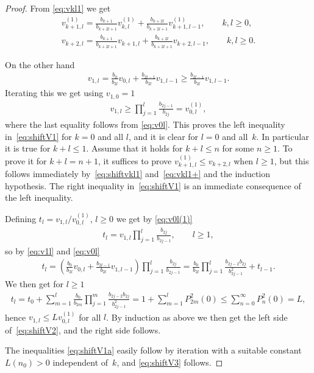 \begin{proof} From \eqref{eq:vkl1} we get
\begin{gather}\label{eq:shiftvkl1}
 v_{k+1,l}^{(1)}=\frac{b_{k+1}}{b_{k+2l+1}}v_{k,l}^{(1)}+ \frac{b_{k+2l}}{b_{k+2l+1}}v_{k+1,l-1}^{(1)},\qquad k,l\ge 0,\\
 \label{eq:vkl1+}
v_{k+2,l}=\frac{b_{k+1}}{b_{k+2l+1}}v_{k+1,l}+ \frac{b_{k+2l}}{b_{k+2l+1}}v_{k+2,l-1},\qquad k,l\ge 0.
\end{gather}

On the other hand
\begin{gather}\label{eq:v1l}
v_{1,l}=\frac{b_0}{b_{2l}} v_{0,l}+\frac{b_{2l-1}}{ b_{2l}}v_{1,l-1}\ge \frac{b_{2l-1}}{ b_{2l}}v_{1,l-1}.
\end{gather}
Iterating this we get using $v_{1,0}=1$
\begin{gather}\label{eq:v0l(1)}
v_{1,l}\ge \prod_{j=1}^l \frac{b_{2j-1}}{b_{2j}}=v_{0,l}^{(1)},
\end{gather}
where the last equality follows from \eqref{eq:v0l}. This proves the left inequality in~\eqref{eq:shiftV1} for $k=0$ and all $l$, and it is clear for $l=0$ and all~$k$. In particular it is true for $k+l\le 1$. Assume that it holds for $k+l\le n$ for some $n\ge 1$. To prove it for $k+l=n+1$, it suffices to prove $v_{k+1,l}^{(1)}\le v_{k+2,l}$ when $l\ge 1$, but this follows immediately by~\eqref{eq:shiftvkl1} and~\eqref{eq:vkl1+} and the induction hypothesis. The right inequality in~\eqref{eq:shiftV1} is an immediate consequence of the left inequality.

Defining $t_l=v_{1,l}/v_{0,l}^{(1)}$, $l\ge 0$ we get by \eqref{eq:v0l(1)}
\begin{gather*}
t_l=v_{1,l}\prod_{j=1}^l \frac{b_{2j}}{b_{2j-1}},\qquad l\ge 1,
\end{gather*}
so by \eqref{eq:v1l} and \eqref{eq:v0l}
\begin{gather*}
t_l=\left(\frac{b_0}{b_{2l}}v_{0,l}+\frac{b_{2l-1}}{b_{2l}}v_{1,l-1}\right)\prod_{j=1}^l \frac{b_{2j}}{b_{2j-1}}=\frac{b_0}{b_{2l}}\prod_{j=1}^l\frac{b_{2j-2}b_{2j}}{b_{2j-1}^2} + t_{l-1}.
\end{gather*}
We then get for $l\ge 1$
\begin{gather*}
t_l=t_0+\sum_{m=1}^l \frac{b_0}{b_{2m}}\prod_{j=1}^m \frac{b_{2j-2}b_{2j}}{b_{2j-1}^2} =1+\sum_{m=1}^l P_{2m}^2(0)\le \sum_{n=0}^\infty P_n^2(0)=L,
\end{gather*}
hence $v_{1,l}\le L v_{0,l}^{(1)}$ for all $l$. By induction as above we then get the left side of~\eqref{eq:shiftV2}, and the right side follows.

The inequalities \eqref{eq:shiftV1a} easily follow by iteration with a suitable constant $L(n_0)>0$ independent of~$k$, and \eqref{eq:shiftV3} follows.
\end{proof}

